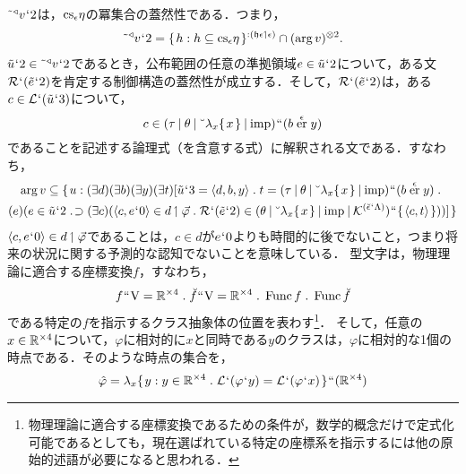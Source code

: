 $ \tilde{\:\:}{^\triangleleft}v{\mspace{1mu}{`}\mspace{1mu}} 2 $は，$ \mathrm{cs}_{\epsilon}\eta $の冪集合の蓋然性である．つまり，
\begin{align}
    \tilde{\:\:}{^\triangleleft}v{\mspace{1mu}{`}\mspace{1mu}} 2 = \{\mspace{2mu}h:h\subseteq \mathrm{cs}_{\epsilon}\eta \mspace{2mu}\}^{:(\mathfrak{h}\epsilon\mathbin{\upharpoonleft}\epsilon)}\cap(\arg v)^{\otimes 2}.
\end{align}
$ \tilde{u}{\mspace{1mu}{`}\mspace{1mu}} 2\in \tilde{\:\:}{^\triangleleft}v{\mspace{1mu}{`}\mspace{1mu}} 2 $であるとき，公布範囲の任意の準拠領域$e\in \tilde{u}{\mspace{1mu}{`}\mspace{1mu}} 2$について，ある文$ \mathcal{R}{\mspace{1mu}{`}\mspace{1mu}}(\tilde{e}{\mspace{1mu}{`}\mspace{1mu}} 2) $を肯定する制御構造の蓋然性が成立する．そして，$ \mathcal{R}{\mspace{1mu}{`}\mspace{1mu}}(\tilde{e}{\mspace{1mu}{`}\mspace{1mu}} 2) $は，ある$ c\in \mathcal{L}{\mspace{1mu}{`}\mspace{1mu}}(\tilde{u}{\mspace{1mu}{`}\mspace{1mu}} 3) $について，
\[
    c\in(\tau\mathbin{\mid}\theta\mathbin{\mid}\breve{\:\:}\lambda_x\{\mspace{2mu}x\mspace{2mu}\}\mathbin{\mid}\mathrm{imp}){\mspace{1mu}{``}\mspace{1mu}} (b\stackrel{\epsilon}{\mathrm{er}}y)
\]
であることを記述する論理式（を含意する式）に解釈される文である．すなわち，
\begin{multline}
    \arg v \subseteq \classab{u:(\exists d)(\exists b)(\exists y)(\exists t)[
        \tilde{u}\fap 3 = \orp{d,b,y}\con{1}
        t = (\tau\resl\theta\resl\brevel{\lambda_x\classab{x}}\resl\mathrm{imp})\img (b\stackrel{\epsilon}{\mathrm{er}}y)\con{1}\\
        (e)(e\in \tilde{u}\fap 2\case{1}{1}{0}
            (\exists c)(\orp{c,e\fap 0}\in d\uphl\vec{\varphi}\con{1}
                \mathcal{R}\fap(\tilde{e}\fap 2)\in (\theta\resl\brevel{\lambda_x\classab{x}}\resl\mathrm{imp}\resl \mathcal{K}^{(\breve{\epsilon}\fap\Lambda)})
                \img\classab{\orp{ c,t }}
            )
        )
    ]
    }
\end{multline}
$ \langle c,e{\mspace{1mu}{`}\mspace{1mu}} 0 \rangle\in d\mathbin{\upharpoonleft}\vec{\varphi} $であることは，$ c\in d $が$ e{\mspace{1mu}{`}\mspace{1mu}} 0 $よりも時間的に後でないこと，つまり将来の状況に関する予測的な認知でないことを意味している．
型文字\kagi{$ \varphi $}は，物理理論に適合する座標変換$f$，すなわち，
\[
    f\img\univ = \timex{\mathbb{R}}{4}\con{1}\breve{f}\img\univ = \timex{\mathbb{R}}{4}\con{1}\func f\con{1}\func\breve{f}
\]
である特定の$f$を指示するクラス抽象体の位置を表わす\footnote{物理理論に適合する座標変換であるための条件が，数学的概念だけで定式化可能であるとしても，現在選ばれている特定の座標系を指示するには他の原始的述語が必要になると思われる．}．
そして，任意の$ x\in \mathbb{R}^{\times 4} $について，$ \varphi $に相対的に$x$と同時である$y$のクラスは，$ \varphi $に相対的な1個の時点である．そのような時点の集合を，
\begin{align*}
    \hat{\varphi} = \lambda_x\classab{y:y\in\timex{\mathbb{R}}{4}\con{1}\mathcal{L}\fap(\varphi \fap y)=\mathcal{L}\fap(\varphi \fap x)}\img(\timex{\mathbb{R}}{4})
\end{align*}
